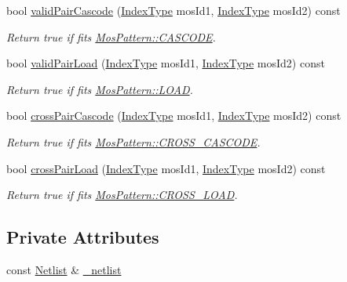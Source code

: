 \begin{DoxyCompactItemize}
bool \hyperlink{classPattern_ab1334774aab3ce88b1d2d799e31f3bd9}{valid\+Pair\+Cascode} (\hyperlink{type_8h_a581e8093e28e7362f2b6937296190676}{Index\+Type} mos\+Id1, \hyperlink{type_8h_a581e8093e28e7362f2b6937296190676}{Index\+Type} mos\+Id2) const
\begin{DoxyCompactList}\small\item\em Return true if fits \hyperlink{type_8h_af19eddb079bfea723256710b029c38e8aac50017227efb09ec529757764e5187c}{Mos\+Pattern\+::\+C\+A\+S\+C\+O\+DE}. \end{DoxyCompactList}\item 
bool \hyperlink{classPattern_acae638957d000c1a163f949c369d5ef4}{valid\+Pair\+Load} (\hyperlink{type_8h_a581e8093e28e7362f2b6937296190676}{Index\+Type} mos\+Id1, \hyperlink{type_8h_a581e8093e28e7362f2b6937296190676}{Index\+Type} mos\+Id2) const
\begin{DoxyCompactList}\small\item\em Return true if fits \hyperlink{type_8h_af19eddb079bfea723256710b029c38e8a615d2885ef7576cedd9aafbb2578f028}{Mos\+Pattern\+::\+L\+O\+AD}. \end{DoxyCompactList}\item 
bool \hyperlink{classPattern_a371cef1fc7d0c4d5b291d80dc5c4b777}{cross\+Pair\+Cascode} (\hyperlink{type_8h_a581e8093e28e7362f2b6937296190676}{Index\+Type} mos\+Id1, \hyperlink{type_8h_a581e8093e28e7362f2b6937296190676}{Index\+Type} mos\+Id2) const
\begin{DoxyCompactList}\small\item\em Return true if fits \hyperlink{type_8h_af19eddb079bfea723256710b029c38e8adb952aa3809767bf108688a754ebbf2c}{Mos\+Pattern\+::\+C\+R\+O\+S\+S\+\_\+\+C\+A\+S\+C\+O\+DE}. \end{DoxyCompactList}\item 
bool \hyperlink{classPattern_afe6e5456a639417112340f5f9d164b32}{cross\+Pair\+Load} (\hyperlink{type_8h_a581e8093e28e7362f2b6937296190676}{Index\+Type} mos\+Id1, \hyperlink{type_8h_a581e8093e28e7362f2b6937296190676}{Index\+Type} mos\+Id2) const
\begin{DoxyCompactList}\small\item\em Return true if fits \hyperlink{type_8h_af19eddb079bfea723256710b029c38e8a19ddbfeab78ac1a4bbe1a186828c5d8d}{Mos\+Pattern\+::\+C\+R\+O\+S\+S\+\_\+\+L\+O\+AD}. \end{DoxyCompactList}\end{DoxyCompactItemize}
\subsection*{Private Attributes}
\begin{DoxyCompactItemize}
\item 
const \hyperlink{classNetlist}{Netlist} \& \hyperlink{classPattern_a71ec4e16ee6088587cece41cb7b027a3}{\+\_\+netlist}
\end{DoxyCompactItemize}


